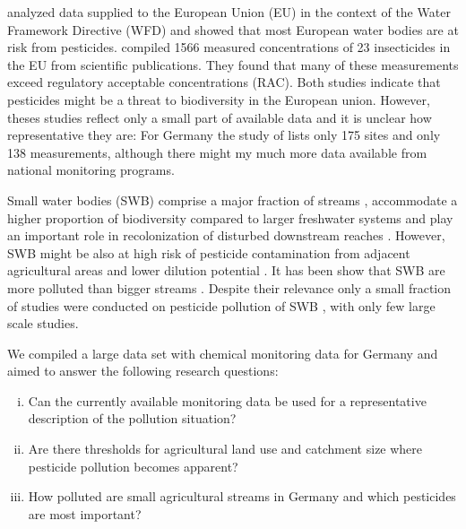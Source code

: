 \documentclass[journal=esthag,manuscript=article]{achemso}
\begin{document}
\citet{malaj_organic_2014} analyzed data supplied to the European Union (EU) in the context of the Water Framework Directive (WFD) and showed that most European water bodies are at risk from pesticides.
\citet{stehle_pesticide_2015} compiled 1566 measured concentrations of 23 insecticides in the EU from scientific publications. 
They found that many of these measurements exceed regulatory acceptable concentrations (RAC).
Both studies indicate that pesticides might be a threat to biodiversity in the European union. 
However, theses studies reflect only a small part of available data and it is unclear how representative they are:
For Germany the study of \citet{malaj_organic_2014} lists only 175 sites and \citet{stehle_pesticide_2015} only 138 measurements, although there might my much more data available from national monitoring programs. %

Small water bodies (SWB) comprise a major fraction of streams \citep{nadeau_hydrological_2007}, accommodate a higher proportion of biodiversity compared to larger freshwater systems \citep{davies_comparison_2008, biggs_report_2014} and play an important role in recolonization of disturbed downstream reaches \citep{liess_analyzing_2005, orlinskiy_forested_2015}.
However, SWB might be also at high risk of pesticide contamination from adjacent agricultural areas and lower dilution potential \citep{schulz_field_2004}.
It has been show that SWB are more polluted than bigger streams \citep{stehle_pesticide_2015,schulz_field_2004}.
Despite their relevance only a small fraction of studies were conducted on pesticide pollution of SWB , with only few large scale studies.

We compiled a large data set with chemical monitoring data for Germany and aimed to answer the following research questions: 

\begin{enumerate}[(i)]
	\item Can the currently available monitoring data be used for a representative description of the pollution situation?
	\item Are there thresholds for agricultural land use and catchment size where pesticide pollution becomes apparent?
	\item  How polluted are small agricultural streams in Germany and which pesticides are most important? 
\end{enumerate}
\end{document}
